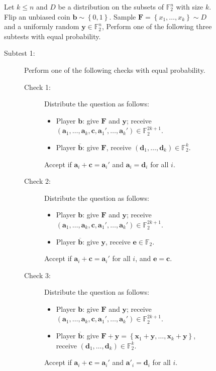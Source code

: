 \documentclass[11pt]{article}
\theoremstyle{plain}
\theoremstyle{definition}
\newcommand {\set} [1] {\ensuremath{ \left\lbrace #1 \right\rbrace }}
\newenvironment{Algorithm}{\begin{framed}}{\end{framed}}
\newcommand{\1}{\mathbb{1}} %
\newcommand{\bF}{\mathbb{F}}
\newcommand{\ba}{\pmb{a}}
\newcommand{\bb}{\pmb{b}}
\newcommand{\bc}{\pmb{c}}
\newcommand{\bd}{\pmb{d}}
\newcommand{\be}{\pmb{e}}
\newcommand{\bx}{\pmb{x}}
\newcommand{\by}{\pmb{y}}
\newcommand{\pmbF}{\pmb{F}}
\begin{document}
\begin{figure}    
\begin{Algorithm}
    Let $k \leq n$ and $D$ be a distribution on the subsets of $\bF_2^n$ with size $k$.
    Flip an unbiased coin $\bb \sim \set{0,1}$.
    Sample $\pmbF = \set{x_1, \ldots, x_k} \sim D$ and a uniformly random $\by \in \bF_2^n$,
    Perform one of the following three subtests with equal probability.
    \begin{description}
	\item[Subtest 1:] Perform one of the following checks with equal probability.
    \begin{description}
        \item[Check 1:] Distribute the question as follows:
        \begin{itemize}
            \item Player $\bb$: give $\pmbF$ and $\by$; receive $(\ba_1, \ldots, \ba_k, \bc, \ba_1', \ldots, \ba_k') \in \bF_2^{2k+1}$.
            \item Player $\overline{\bb}$: give $\pmbF$, receive $(\bd_1,\ldots, \bd_k) \in \bF_2^k$.
        \end{itemize}
        Accept if $\ba_i + \bc = \ba_i'$ and $\ba_i = \bd_i$ for all $i$.
        \item [Check 2:] Distribute the question as follows:
        \begin{itemize}
            \item Player $\bb$: give $\pmbF$ and $\by$; receive $(\ba_1, \ldots, \ba_k, \bc, \ba_1', \ldots, \ba_k') \in \bF_2^{2k+1}$.
            \item Player $\overline{\bb}$: give $\by$, receive $\be \in \bF_2$.
        \end{itemize}
        Accept if $\ba_i + \bc = \ba_i'$ for all $i$, and $\be = \bc$.
        \item[Check 3:]
        Distribute the question as follows:
        \begin{itemize}
            \item Player $\bb$: give $\pmbF$ and $\by$; receive $(\ba_1, \ldots, \ba_k, \bc, \ba_1', \ldots, \ba_k') \in \bF_2^{2k+1}$.
            \item Player $\overline{\bb}$: give $\pmbF+\by = \set{\bx_1+\by, \ldots, \bx_k+\by}$, receive $(\bd_1,\ldots, \bd_k) \in \bF_2^k$.
        \end{itemize}
        Accept if $\ba_i + \bc = \ba_i'$ and $\ba'_i = \bd_i$ for all $i$.
    \end{description}

\end{description}
\end{Algorithm}
\end{figure}
\end{document}
